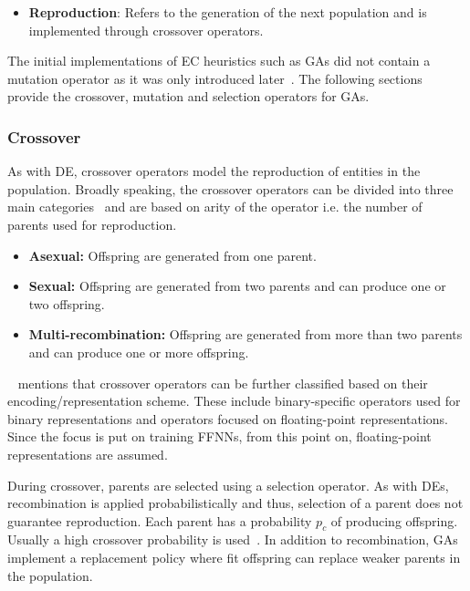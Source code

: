 {\begin{itemize}
	\item \textbf{Reproduction}: Refers to the generation of the next population and is implemented through crossover operators.
\end{itemize}

The initial implementations of \acs{EC} heuristics such as \acp{GA} did not contain a mutation operator as it was only introduced later~\cite{ref:engelbrecht:2007}. The following sections provide the crossover, mutation and selection operators for \acp{GA}.

\subsubsection{Crossover}\label{sec:heuristics:mh:ga:crossover}

As with \acs{DE}, crossover operators model the reproduction of entities in the population. Broadly speaking, the crossover operators can be divided into three main categories~\cite{ref:engelbrecht:2007} and are based on arity of the operator i.e. the number of parents used for reproduction.

\begin{itemize}
	\item \textbf{Asexual:} Offspring are generated from one parent.

	\item \textbf{Sexual:} Offspring are generated from two parents and can produce one or two offspring.

	\item \textbf{Multi-recombination:} Offspring are generated from more than two parents and can produce one or more offspring.
\end{itemize}

\citeauthor{ref:engelbrecht:2007}~\cite{ref:engelbrecht:2007} mentions that crossover operators can be further classified based on their encoding/representation scheme. These include binary-specific operators used for binary representations and operators focused on floating-point representations. Since the focus is put on training \acp{FFNN}, from this point on, floating-point representations are assumed.

During crossover, parents are selected using a selection operator. As with \acp{DE}, recombination is applied probabilistically and thus, selection of a parent does not guarantee reproduction. Each parent has a probability $p_{c}$ of producing offspring. Usually a high crossover probability is used~\cite{ref:engelbrecht:2007}. In addition to recombination, \acp{GA} implement a replacement policy where fit offspring can replace weaker parents in the population.

}
